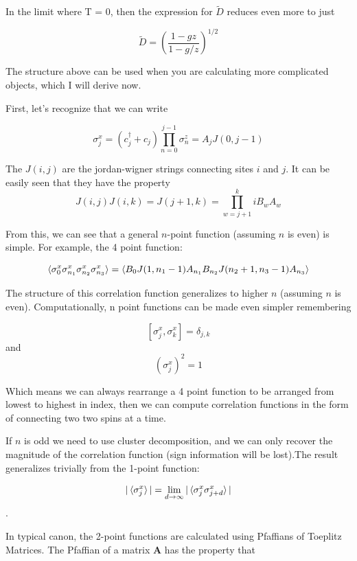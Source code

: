 \documentclass{article}
\begin{document}
In the limit where T = 0, then the expression for $\tilde{D}$ reduces even more to just 

\begin{equation}
    \tilde{D} = \left( \frac{1-gz}{1-g/z} \right)^{1/2}
\end{equation}

The structure above can be used when you are calculating more complicated objects, which I will derive now.

First, let's recognize that we can write 

\begin{equation}
    \sigma^x_{j} = (c^\dagger_j + c_j) \prod_{n=0}^{j-1} \sigma^z_n = A_j J(0,j-1)
\end{equation}

The $J(i,j)$ are the jordan-wigner strings connecting sites $i$ and $j$. It can be easily seen that they have the property $$J(i,j) J(i,k) = J(j+1,k)= \prod_{w=j+1}^{k} iB_{w}A_{w}$$ 


From this, we can see that a general $n$-point function (assuming $n$ is even) is simple. For example, the 4 point function:

\begin{equation}
    \braket{\sigma^x_0 \sigma^x_{n_1} \sigma^x_{n_2} \sigma^x_{n_3}} = \braket{B_0 J(1,n_1-1)A_{n_1} B_{n_2} J(n_2+1,n_3-1) A_{n_3} }
\end{equation}

The structure of this correlation function generalizes to higher $n$ (assuming $n$ is even). Computationally, n point functions can be made even simpler remembering 

$$[\sigma^x_j,\sigma^x_k]= \delta_{j,k}$$ and $$(\sigma^x_j)^2=1$$

Which means we can always rearrange a 4 point function to be arranged from lowest to highest in index, then we can compute correlation functions in the form of connecting two two spins at a time.

If $n$ is odd we need to use cluster decomposition, and we can only recover the magnitude of the correlation function (sign information will be lost).The result generalizes trivially from the 1-point function:

\begin{equation}
    |\braket{\sigma^x_j}| = \lim_{d\to \infty} |\braket{\sigma^x_j \sigma^x_{j+d}}|
\end{equation}.

In typical canon, the 2-point functions are calculated using Pfaffians of Toeplitz Matrices. The Pfaffian of a matrix $\mathbf{A}$ has the property that 
\end{document}
